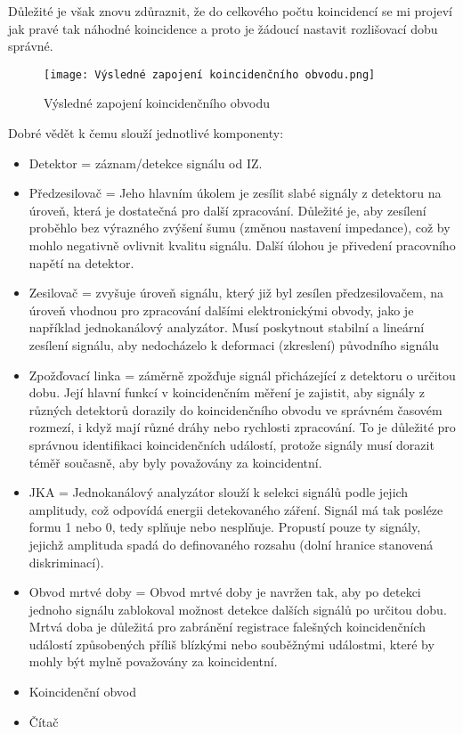 Důležité je však znovu zdůraznit, že do celkového počtu koincidencí se mi projeví jak pravé tak náhodné koincidence a proto je žádoucí nastavit rozlišovací dobu správné.


\begin{figure}[ht!]
    \centering
    \texttt{[image: Výsledné zapojení koincidenčního obvodu.png]}
    \caption{Výsledné zapojení koincidenčního obvodu}
\end{figure}

Dobré vědět k čemu slouží jednotlivé komponenty:

\begin{itemize}
    \item Detektor = záznam/detekce signálu od IZ.
    \item Předzesilovač = Jeho hlavním úkolem je zesílit slabé signály z detektoru na úroveň, která je dostatečná pro další zpracování. Důležité je, aby zesílení proběhlo bez výrazného zvýšení šumu (změnou nastavení impedance), což by mohlo negativně ovlivnit kvalitu signálu. Další úlohou je přivedení pracovního napětí na detektor.
    \item Zesilovač = zvyšuje úroveň signálu, který již byl zesílen předzesilovačem, na úroveň vhodnou pro zpracování dalšími elektronickými obvody, jako je například jednokanálový analyzátor. Musí poskytnout stabilní a lineární zesílení signálu, aby nedocházelo k deformaci (zkreslení) původního signálu
    \item Zpožďovací linka = záměrně zpožďuje signál přicházející z detektoru o určitou dobu. Její hlavní funkcí v koincidenčním měření je zajistit, aby signály z různých detektorů dorazily do koincidenčního obvodu ve správném časovém rozmezí, i když mají různé dráhy nebo rychlosti zpracování. To je důležité pro správnou identifikaci koincidenčních událostí, protože signály musí dorazit téměř současně, aby byly považovány za koincidentní.
    \item JKA = Jednokanálový analyzátor slouží k selekci signálů podle jejich amplitudy, což odpovídá energii detekovaného záření. Signál má tak posléze formu 1 nebo 0, tedy splňuje nebo nesplňuje. Propustí pouze ty signály, jejichž amplituda spadá do definovaného rozsahu (dolní hranice stanovená diskriminací).
    \item Obvod mrtvé doby = Obvod mrtvé doby je navržen tak, aby po detekci jednoho signálu zablokoval možnost detekce dalších signálů po určitou dobu. Mrtvá doba je důležitá pro zabránění registrace falešných koincidenčních událostí způsobených příliš blízkými nebo souběžnými událostmi, které by mohly být mylně považovány za koincidentní.
    \item Koincidenční obvod
    \item Čítač
\end{itemize}

